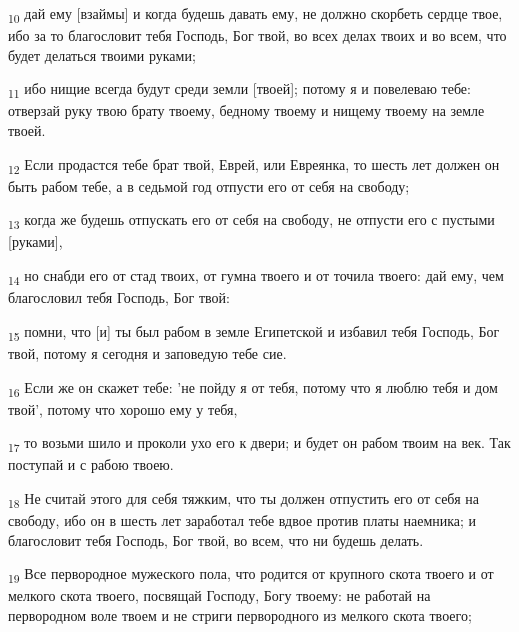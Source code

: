 \begin{tcolorbox}
\textsubscript{10} дай ему [взаймы] и когда будешь давать ему, не должно скорбеть сердце твое, ибо за то благословит тебя Господь, Бог твой, во всех делах твоих и во всем, что будет делаться твоими руками;
\end{tcolorbox}
\begin{tcolorbox}
\textsubscript{11} ибо нищие всегда будут среди земли [твоей]; потому я и повелеваю тебе: отверзай руку твою брату твоему, бедному твоему и нищему твоему на земле твоей.
\end{tcolorbox}
\begin{tcolorbox}
\textsubscript{12} Если продастся тебе брат твой, Еврей, или Евреянка, то шесть лет должен он быть рабом тебе, а в седьмой год отпусти его от себя на свободу;
\end{tcolorbox}
\begin{tcolorbox}
\textsubscript{13} когда же будешь отпускать его от себя на свободу, не отпусти его с пустыми [руками],
\end{tcolorbox}
\begin{tcolorbox}
\textsubscript{14} но снабди его от стад твоих, от гумна твоего и от точила твоего: дай ему, чем благословил тебя Господь, Бог твой:
\end{tcolorbox}
\begin{tcolorbox}
\textsubscript{15} помни, что [и] ты был рабом в земле Египетской и избавил тебя Господь, Бог твой, потому я сегодня и заповедую тебе сие.
\end{tcolorbox}
\begin{tcolorbox}
\textsubscript{16} Если же он скажет тебе: 'не пойду я от тебя, потому что я люблю тебя и дом твой', потому что хорошо ему у тебя,
\end{tcolorbox}
\begin{tcolorbox}
\textsubscript{17} то возьми шило и проколи ухо его к двери; и будет он рабом твоим на век. Так поступай и с рабою твоею.
\end{tcolorbox}
\begin{tcolorbox}
\textsubscript{18} Не считай этого для себя тяжким, что ты должен отпустить его от себя на свободу, ибо он в шесть лет заработал тебе вдвое против платы наемника; и благословит тебя Господь, Бог твой, во всем, что ни будешь делать.
\end{tcolorbox}
\begin{tcolorbox}
\textsubscript{19} Все первородное мужеского пола, что родится от крупного скота твоего и от мелкого скота твоего, посвящай Господу, Богу твоему: не работай на первородном воле твоем и не стриги первородного из мелкого скота твоего;
\end{tcolorbox}
